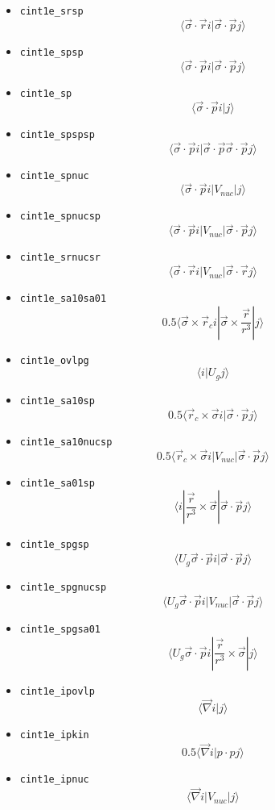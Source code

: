 \documentclass{article}
\begin{document}
\begin{itemize}
\begin{itemize}
  \item
    \verb!cint1e_srsp!
    \[\langle \vec{\sigma}\cdot\vec{r} i| \vec{\sigma}\cdot\vec{p}j\rangle \]
  \item
    \verb!cint1e_spsp!
    \[\langle \vec{\sigma}\cdot\vec{p} i| \vec{\sigma}\cdot\vec{p}j\rangle \]
  \item
    \verb!cint1e_sp! \[\langle \vec{\sigma}\cdot\vec{p} i|j\rangle \]
  \item
    \verb!cint1e_spspsp!
    \[\langle \vec{\sigma}\cdot\vec{p} i| \vec{\sigma}\cdot\vec{p} \vec{\sigma}\cdot\vec{p}j\rangle \]
  \item
    \verb!cint1e_spnuc!
    \[\langle \vec{\sigma}\cdot\vec{p} i| V_{nuc} |j\rangle \]
  \item
    \verb!cint1e_spnucsp!
    \[\langle \vec{\sigma}\cdot\vec{p} i| V_{nuc} | \vec{\sigma}\cdot\vec{p}j\rangle \]
  \item
    \verb!cint1e_srnucsr!
    \[\langle \vec{\sigma}\cdot\vec{r} i| V_{nuc} | \vec{\sigma}\cdot\vec{r}j\rangle \]
  \item
    \verb!cint1e_sa10sa01!
    \[0.5\langle\vec{\sigma} \times \vec{r}_c i|\vec{\sigma} \times \frac{\vec{r}}{r^3} |j\rangle \]
  \item
    \verb!cint1e_ovlpg! \[\langle i|U_g j\rangle \]
  \item
    \verb!cint1e_sa10sp!
    \[0.5\langle\vec{r}_c \times\vec{\sigma} i| \vec{\sigma}\cdot\vec{p}j\rangle \]
  \item
    \verb!cint1e_sa10nucsp!
    \[0.5\langle\vec{r}_c \times\vec{\sigma} i| V_{nuc} | \vec{\sigma}\cdot\vec{p}j\rangle \]
  \item
    \verb!cint1e_sa01sp!
    \[\langle i| \frac{\vec{r}}{r^3} \times\vec{\sigma} | \vec{\sigma}\cdot\vec{p}j\rangle \]
  \item
    \verb!cint1e_spgsp!
    \[\langle U_g \vec{\sigma}\cdot\vec{p} i| \vec{\sigma}\cdot\vec{p}j\rangle \]
  \item
    \verb!cint1e_spgnucsp!
    \[\langle U_g \vec{\sigma}\cdot\vec{p} i| V_{nuc} | \vec{\sigma}\cdot\vec{p}j\rangle \]
  \item
    \verb!cint1e_spgsa01!
    \[\langle U_g \vec{\sigma}\cdot\vec{p} i| \frac{\vec{r}}{r^3} \times\vec{\sigma} |j\rangle \]
  \item
    \verb!cint1e_ipovlp! \[\langle \vec{\nabla} i|j\rangle \]
  \item
    \verb!cint1e_ipkin!
    \[0.5\langle \vec{\nabla} i| p \cdot pj\rangle \]
  \item
    \verb!cint1e_ipnuc! \[\langle \vec{\nabla} i| V_{nuc}|j\rangle \]

\end{itemize}
\end{itemize}
\end{document}
